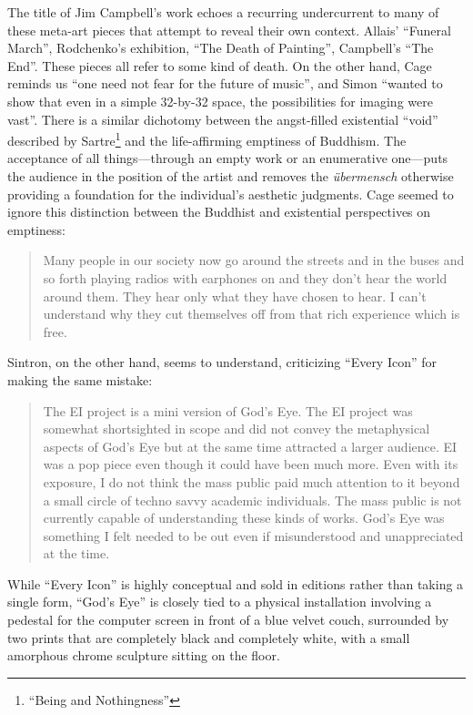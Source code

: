 \documentclass{thesis}
\begin{document}
The title of Jim Campbell's work echoes a recurring undercurrent to many of these meta-art pieces that attempt to reveal their own context. Allais' ``Funeral March'', Rodchenko's exhibition, ``The Death of Painting'', Campbell's ``The End''. These pieces all refer to some kind of death. On the other hand, Cage reminds us ``one need not fear for the future of music'', and Simon ``wanted to show that even in a simple 32-by-32 space, the possibilities for imaging were vast''\cite{matthew_mirapaul_in_1997}. There is a similar dichotomy between the angst-filled existential ``void'' described by Sartre\footnote{``Being and Nothingness''} and the life-affirming emptiness of Buddhism. The acceptance of all things---through an empty work or an enumerative one---puts the audience in the position of the artist and removes the \emph{\"ubermensch} otherwise providing a foundation for the individual's aesthetic judgments. Cage seemed to ignore this distinction between the Buddhist and existential perspectives on emptiness:
	
\begin{quote}
Many people in our society now go around the streets and in the buses and so forth playing radios with earphones on and they don't hear the world around them. They hear only what they have chosen to hear. I can't understand why they cut themselves off from that rich experience which is free.
\end{quote}

Sintron, on the other hand, seems to understand, criticizing ``Every Icon'' for making the same mistake:\cite{olga_goriunova_and_alexei_shulgin_touching_2003}

	\begin{quote}
	The EI project is a mini version of God's Eye. The EI project was somewhat shortsighted in scope and did not convey the metaphysical aspects of God's Eye but at the same time attracted a larger audience. EI was a pop piece even though it could have been much more. Even with its exposure, I do not think the mass public paid much attention to it beyond a small circle of techno savvy academic individuals. The mass public is not currently capable of understanding these kinds of works. God's Eye was something I felt needed to be out even if misunderstood and unappreciated at the time.
	\end{quote}
	
While ``Every Icon'' is highly conceptual and sold in editions rather than taking a single form, ``God's Eye'' is closely tied to a physical installation involving a pedestal for the computer screen in front of a blue velvet couch, surrounded by two prints that are completely black and completely white, with a small amorphous chrome sculpture sitting on the floor. 
		
\end{document}
